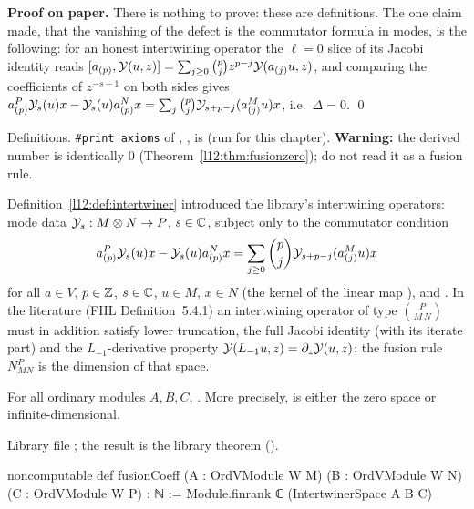 \textbf{Proof on paper.} There is nothing to prove: these are definitions. The one claim made, that the vanishing of the defect is the commutator formula in modes,
is the following: for an honest intertwining operator the $\ell=0$ slice of its Jacobi identity reads
$[a_{(p)},\mathcal{Y}(u,z)] = \sum_{j\ge0}\binom pj z^{p-j}\mathcal{Y}(a_{(j)}u,z)$, and comparing the coefficients of $z^{-s-1}$ on both sides gives
$a^P_{(p)}\mathcal{Y}_s(u)x - \mathcal{Y}_s(u)a^N_{(p)}x = \sum_j\binom pj\mathcal{Y}_{s+p-j}(a^M_{(j)}u)x$, i.e.\ $\Delta = 0$. \qed

\begin{status}
Definitions. \texttt{\#print axioms} of , ,  is
\lean{[propext, Classical.}\allowbreak{}\allowbreak\lean{sound]} (run for this chapter). \textbf{Warning:}
the derived number  is identically $0$ (Theorem~\ref{l12:thm:fusionzero}); do not read it as a fusion rule.
\end{status}

Definition~\ref{l12:def:intertwiner} introduced the library's intertwining operators: mode data
$\mathcal{Y}_s:M\otimes N\to P$, $s\in{\mathbb{C}}$, subject only to the commutator condition
\begin{equation*}
 a^P_{(p)}\mathcal{Y}_s(u)x - \mathcal{Y}_s(u)a^N_{(p)}x = \sum_{j\ge0}\binom pj\mathcal{Y}_{s+p-j}(a^M_{(j)}u)x
\end{equation*}
for all $a\in V$, $p\in{\mathbb{Z}}$, $s\in{\mathbb{C}}$, $u\in M$, $x\in N$ (the kernel  of the linear map
), and . In the
literature (FHL Definition~5.4.1) an intertwining operator of type $\binom{P}{M\,N}$ must in addition satisfy lower
truncation, the full Jacobi identity (with its iterate part) and the $L_{-1}$-derivative property
$\mathcal{Y}(L_{-1}u,z) = \partial_z\mathcal{Y}(u,z)$; the fusion rule $N_{MN}^P$ is the dimension of that space.

\begin{theorem}\label{l12:thm:fusionzero}
For all ordinary modules $A,B,C$, . More precisely,  is either
the zero space or infinite-dimensional.
\end{theorem}
\noindent Library file ; the result is the library theorem
\allowbreak{}\allowbreak{}\allowbreak{} ().
\begin{leancode}
noncomputable def fusionCoeff (A : OrdVModule W M) (B : OrdVModule W N) (C : OrdVModule W P) : ℕ :=
  Module.finrank ℂ (IntertwinerSpace A B C)
\end{leancode}

